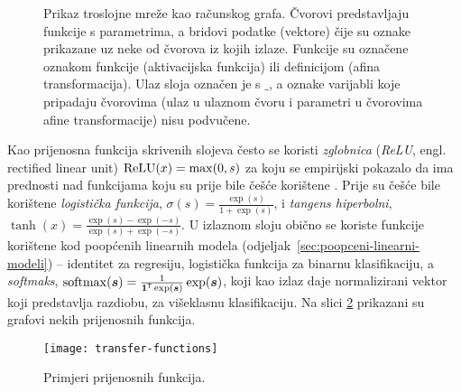 \documentclass[utf8, diplomski, lmodern]{fer}
\begin{document}
\begin{figure}
	\centering
	\caption{Prikaz troslojne mreže kao računskog grafa. Čvorovi predstavljaju funkcije s parametrima, a bridovi podatke (vektore) čije su oznake prikazane uz neke od čvorova iz kojih izlaze. Funkcije su označene oznakom funkcije (aktivacijska funkcija) ili definicijom (afina transformacija). Ulaz sloja označen je s $\_$, a oznake varijabli koje pripadaju čvorovima (ulaz u ulaznom čvoru i parametri u čvorovima afine transformacije) nisu podvučene.}
	\label{fig:racunski-graf}
\end{figure}

Kao prijenosna funkcija skrivenih slojeva često se koristi \emph{zglobnica} (\emph{ReLU}, engl. rectified linear unit) $\operatorname{ReLU}(x)=\max(0, s)$ za koju se empirijski pokazalo da ima prednosti nad funkcijama koju su prije bile češće korištene \citep{Glorot:2011:DSRNN}. Prije su češće bile korištene \emph{logistička funkcija}, $\sigma(s)=\frac{\exp(s)}{1+\exp(s)}$, i \emph{tangens hiperbolni}, $\tanh(x)=\frac{\exp(s)-\exp(-s)}{\exp(s)+\exp(-s)}$. U izlaznom sloju obično se koriste funkcije korištene kod poopćenih linearnih modela (odjeljak~\ref{sec:poopceni-linearni-modeli}) -- identitet za regresiju, logistička funkcija za binarnu klasifikaciju, a \emph{softmaks}, $\softmax(\vec s)=\frac{1}{\cvec 1^\tp\exp(\vec s)}\exp(\vec s)$, koji kao izlaz daje normalizirani vektor koji predstavlja razdiobu, za višeklasnu klasifikaciju. Na slici \ref{fig:prijenosne-funkcije} prikazani su grafovi nekih prijenosnih funkcija.

\begin{figure}
	\centering
	\texttt{[image: transfer-functions]}
	\caption[s]{Primjeri prijenosnih funkcija.}
	\label{fig:prijenosne-funkcije}
\end{figure}
\end{document}
